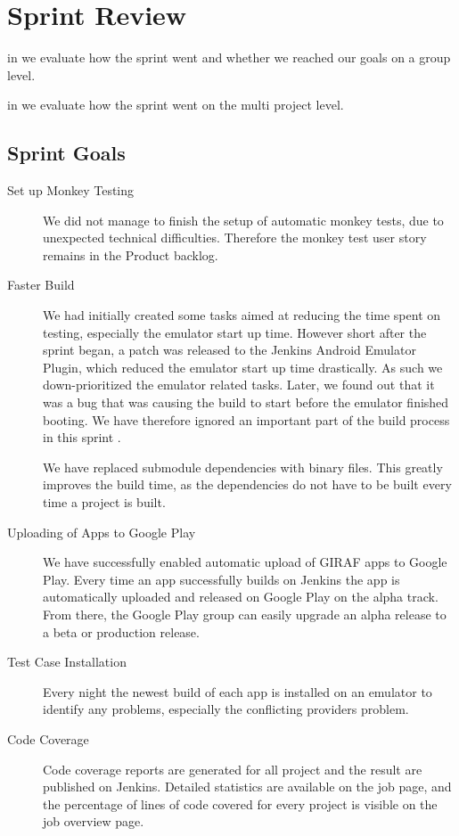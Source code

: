 \chapter{Sprint Review}\label{chap:sprint2_end}

\begin{chapterorganization}
  \item in  we evaluate how the sprint went and whether we reached our goals on a group level.
  \item in  we evaluate how the sprint went on the multi project level.
\end{chapterorganization}

\section{Sprint Goals}\label{sec:s2_goals}
\begin{description}
    \item[Set up Monkey Testing] We did not manage to finish the setup of automatic monkey tests, due to unexpected technical difficulties. Therefore the monkey test user story remains in the Product backlog.
    \item[Faster Build] We had initially created some tasks aimed at reducing the time spent on testing, especially the emulator start up time. However short after the sprint began, a patch was released to the Jenkins Android Emulator Plugin, which reduced the emulator start up time drastically. As such we down-prioritized the emulator related tasks. Later, we found out that it was a bug that was causing the build to start before the emulator finished booting. We have therefore ignored an important part of the build process in this sprint .

    We have replaced submodule dependencies with binary files. This greatly improves the build time, as the dependencies do not have to be built every time a project is built.
    \item[Uploading of Apps to Google Play] We have successfully enabled automatic upload of GIRAF apps to Google Play. Every time an app successfully builds on Jenkins the app is automatically uploaded and released on Google Play on the alpha track. From there, the Google Play group can easily upgrade an alpha release to a beta or production release.
    \item[Test Case Installation] Every night the newest build of each app is installed on an emulator to identify any problems, especially the conflicting providers problem.
    \item[Code Coverage] Code coverage reports are generated for all project and the result are published on Jenkins. Detailed statistics are available on the job page, and the percentage of lines of code covered for every project is visible on the job overview page. 
\end{description}

